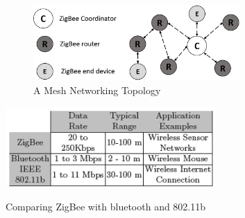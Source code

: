 \begin{figure}[h]
\centering
\includegraphics[width=0.7\textwidth]{Figures/zigbee2}
\caption{A Mesh Networking Topology}
\label{zigbee2}
\end{figure}

\begin{table}[h]
\centering
\includegraphics[width=0.6\textwidth]{Figures/comparison_}
\caption{Comparing ZigBee with bluetooth and 802.11b}
\label{table:comparison}
\end{table}

